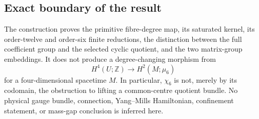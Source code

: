 \subsection{Exact boundary of the result}
\label{zdc:subsec:boundary}

The construction proves the primitive fibre-degree map, its saturated
kernel, its order-twelve and order-six finite reductions, the distinction
between the full coefficient group and the selected cyclic quotient, and
the two matrix-group embeddings.  It does not produce a degree-changing
morphism from
\[
 H^4(U;\mathbb Z)\longrightarrow H^2(M;\mu_6)
\]
for a four-dimensional spacetime $M$.  In particular,
\(\chi_6\) is not, merely by its codomain, the obstruction to lifting a
common-centre quotient bundle.  No physical gauge bundle, connection,
Yang--Mills Hamiltonian, confinement statement, or mass-gap conclusion is
inferred here.
